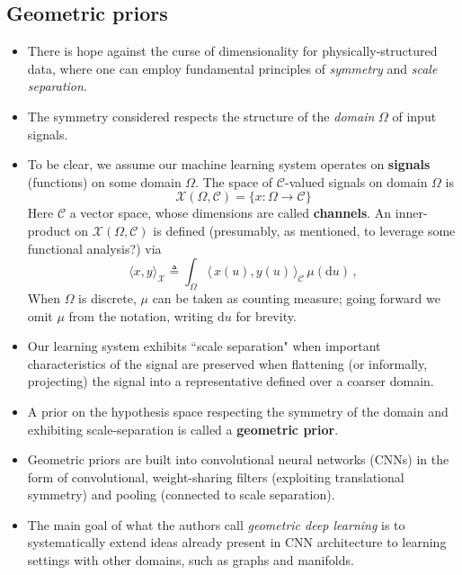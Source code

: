 \documentclass[12pt]{article}
\numberwithin{equation}{section}
\theoremstyle{definition}
\newcommand{		\1		}	{	\bm{1}					}%
\begin{document}
\subsection{Geometric priors}

\begin{itemize}

\item There is hope against the curse of dimensionality for physically-structured data, where one can employ fundamental principles of \emph{symmetry} and \emph{scale separation}.

\item The symmetry considered respects the structure of the \emph{domain} $\Omega$ of input signals. 

\item To be clear, we assume our machine learning system operates on \textbf{signals} (functions) on some domain $\Omega$. The space of $\mathcal{C}$-valued signals on domain $\Omega$ is
    $$
    \mathcal{X} (\Omega, \mathcal{C} ) = \{ x : \Omega \to \mathcal{C} \} 
    $$
    Here $\mathcal{C}$ a vector space, whose dimensions are called \textbf{channels}. An inner-product on $\mathcal{X}(\Omega, \mathcal{C} )$ is defined (presumably, as mentioned, to leverage some functional analysis?)  via
    $$
    \langle x, y \rangle_{\mathcal{X}} \triangleq \int_\Omega \langle\, x(u), y(u) \, \rangle_{\mathcal{C}} \, \mu( \textrm{d}u )\,,
    $$
    When $\Omega$ is discrete, $\mu$ can be taken as counting measure; going forward we omit $\mu$ from the notation, writing $\textrm{d}u$ for brevity. 
    
\item Our learning system exhibits ``scale separation" when important characteristics of the signal are preserved when flattening (or informally, projecting) the signal into a representative defined over a coarser domain. 

\item A prior on the hypothesis space respecting the symmetry of the domain and exhibiting scale-separation is called a \textbf{geometric prior}. 

\item Geometric priors are built into convolutional neural networks (CNNs) in the form of convolutional, weight-sharing filters (exploiting translational symmetry) and pooling (connected to scale separation). 

\item The main goal of what the authors call \emph{geometric deep learning} is to systematically extend ideas already present in CNN architecture to learning settings with other domains, such as graphs and manifolds. 

\end{itemize}
\end{document}
